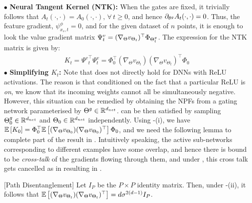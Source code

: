 $\bullet$ \textbf{Neural Tangent Kernel (NTK):} When the gates are fixed, it trivially follows that $A_t(\cdot,\cdot)=A_0(\cdot,\cdot),\,\forall\,t\geq 0$, and hence $\partial_{\theta^g} A_t(\cdot,\cdot)=0$. Thus, the feature gradient, $\psi^{\phi}_{x_s,t}=0$, and for the given dataset of $n$ points, it is enough to look the value gradient matrix $\Psi^v_t=(\nabla_{\Theta}v_{\Theta_t})^\top \Phi_{{\Theta}^g_t}$. The expression for the NTK matrix is given by:
\begin{align}\label{eq:kt}
K_t={\Psi^v}^\top_t\Psi^v_t= \Phi^\top_0(\nabla_{\Theta}v_{\Theta_t})(\nabla_{\Theta}v_{\Theta_t})^\top \Phi_0
\end{align}
$\bullet$ \textbf{Simplifying $K_t$:} Note that  does not directly hold for DNNs with ReLU activations. The reason is that conditioned on the fact that a particular ReLU is \emph{on}, we know that its incoming weights cannot all be simultaneously negative. However, this situation can be remedied by obtaining the NPFs from a gating network parameterised by ${\Theta}^g\in\mathbb{R}^{d_{net}}$.   can be then satisfied by sampling ${\Theta}^g_0\in\mathbb{R}^{d_{net}}$ and $\Theta_0\in\mathbb{R}^{d_{net}}$ independently. Using -(i), we have $\mathbb{E}\left[K_0\right]=\Phi^\top_0\mathbb{E}\left[(\nabla_{\Theta}v_{\Theta_0})(\nabla_{\Theta}v_{\Theta_0})^\top\right]\Phi_0$, and we need the following lemma to complete part of the result in . Intuitively speaking, the active sub-networks corresponding to different examples have some overlap, and hence there is bound to be \emph{cross-talk} of the gradients flowing through them, and under , this cross talk gets cancelled as in  resulting in .
\begin{lemma}\label{lm:disentangle}[Path Disentanglement] Let $I_P$ be the $P\times P$ identity matrix. Then, 
under -(ii), it follows that $\mathbb{E}\left[(\nabla_{\Theta}v_{\Theta_t})(\nabla_{\Theta}v_{\Theta_t})^\top \right]= d\sigma^{2(d-1)}I_{P}$.
\end{lemma}

